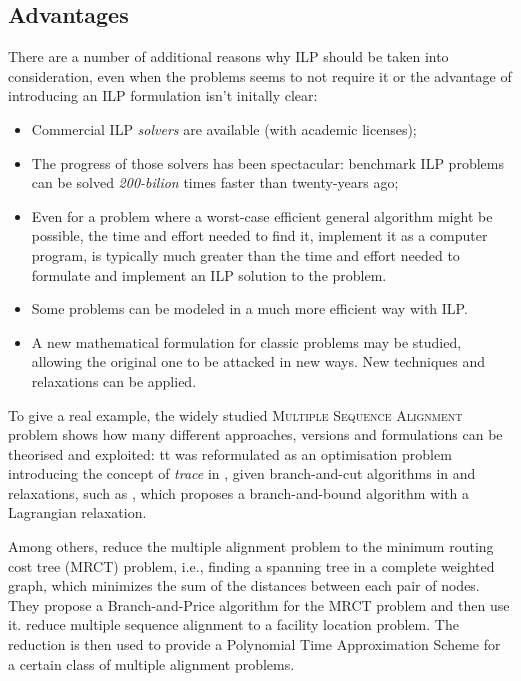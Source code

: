 \subsection{Advantages}

There are a number of additional reasons why ILP should be taken into consideration, even when the problems seems to not require it or the advantage of introducing an ILP formulation isn't initally clear\cite{gusfieldilp}:

\begin{itemize}
	\item Commercial ILP \textit{solvers} are available (with academic licenses);
	\item The progress of those solvers has been spectacular: benchmark ILP problems can be solved \textit{200-bilion} times faster than twenty-years ago;
	\item Even for a problem where a worst-case efficient general algorithm might be possible, the time and effort needed to find it, implement it as a computer program, is typically much greater than the time and effort needed to formulate and implement an ILP solution to the problem.
	\item Some problems can be modeled in a much more efficient way with ILP.
	\item A new mathematical formulation for classic problems may be studied, allowing the original one to be attacked in new ways. New techniques and relaxations can be applied.
\end{itemize}

To give a real example, the widely studied \textsc{Multiple Sequence Alignment} problem \cite{carrillo1988multiple} shows how many different approaches, versions and formulations can be theorised and exploited: tt was reformulated as an optimisation problem introducing the concept of \textit{trace} in \cite{Kececioglu1993}, given branch-and-cut algorithms in \cite{KECECIOGLU2000143} and relaxations, such as \cite{Althaus2007}, which proposes a branch-and-bound algorithm with a Lagrangian relaxation. 

Among others, \cite{NET:NET10022} reduce the multiple alignment problem to the minimum routing cost tree (MRCT) problem, i.e., finding a spanning tree in a complete weighted graph, which minimizes the sum of the distances between each pair of nodes. They propose a Branch-and-Price algorithm for the MRCT problem and then use it. \cite{DBLP:conf/stringology/JustV00} reduce multiple sequence alignment to a facility location problem. The reduction is then used to provide a Polynomial Time Approximation Scheme for a certain class of multiple alignment problems.


